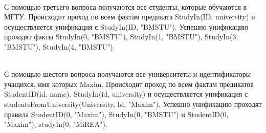\\

С помощью третьего вопроса получаются все студенты, которые обучаются в МГТУ. Происходит проход по всем фактам предиката StudyIn(ID, university) и осуществляется унификация с StudyIn(ID, "BMSTU"). Успешно унификацию проходят факты StudyIn(0, "BMSTU"), StudyIn(1,
"BMSTU"), StudyIn(3, "BMSTU"), StudyIn(4, "BMSTU").  

\\

С помощью шестого вопроса получаются все университеты и идентификаторы учащихся, имя которых Maxim. Происходит проход по всем фактам
предикатов StudentID(id, name), StudyIn(id, university) и осуществляется унификация с studentsFromUniversity(University, Id, "Maxim"). Успешно унификацию проходят правила StudentID(0, "Maxim"), StudyIn(0,
"BMSTU") и StudentID(0, "Maxim"), studyIn(0, "MiREA").